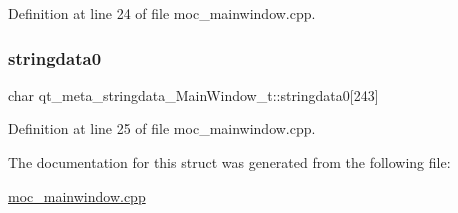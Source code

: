 Definition at line 24 of file moc\+\_\+mainwindow.\+cpp.

\mbox{\label{structqt__meta__stringdata___main_window__t_a6adbd76872d73405cf63968af7211971}} 
\subsubsection{\texorpdfstring{stringdata0}{stringdata0}}
{\footnotesize\ttfamily char qt\+\_\+meta\+\_\+stringdata\+\_\+\+Main\+Window\+\_\+t\+::stringdata0\mbox{[}243\mbox{]}}



Definition at line 25 of file moc\+\_\+mainwindow.\+cpp.



The documentation for this struct was generated from the following file\+:\begin{DoxyCompactItemize}
\item 
\hyperlink{moc__mainwindow_8cpp}{moc\+\_\+mainwindow.\+cpp}\end{DoxyCompactItemize}
